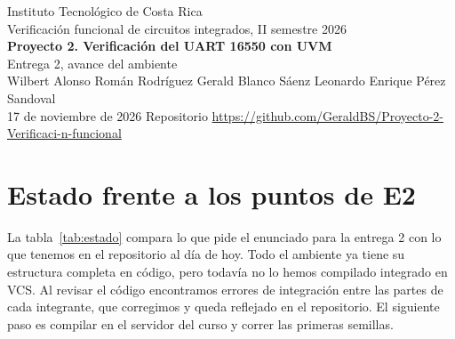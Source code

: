 \documentclass[11pt,letterpaper]{article}
\begin{document}
\begin{center}
{\large Instituto Tecnológico de Costa Rica}\\[2pt]
Verificación funcional de circuitos integrados, II semestre 2026\\[6pt]
{\Large\bfseries Proyecto 2. Verificación del UART 16550 con UVM}\\[2pt]
{\large Entrega 2, avance del ambiente}\\[6pt]
Wilbert Alonso Román Rodríguez \quad Gerald Blanco Sáenz \quad Leonardo Enrique Pérez Sandoval\\[2pt]
17 de noviembre de 2026 \quad Repositorio \url{https://github.com/GeraldBS/Proyecto-2-Verificaci-n-funcional}
\end{center}

\section{Estado frente a los puntos de E2}

La tabla~\ref{tab:estado} compara lo que pide el enunciado para la entrega 2 con lo que tenemos en el repositorio al día de hoy. Todo el ambiente ya tiene su estructura completa en código, pero todavía no lo hemos compilado integrado en VCS. Al revisar el código encontramos errores de integración entre las partes de cada integrante, que corregimos y queda reflejado en el repositorio. El siguiente paso es compilar en el servidor del curso y correr las primeras semillas.
\end{document}
